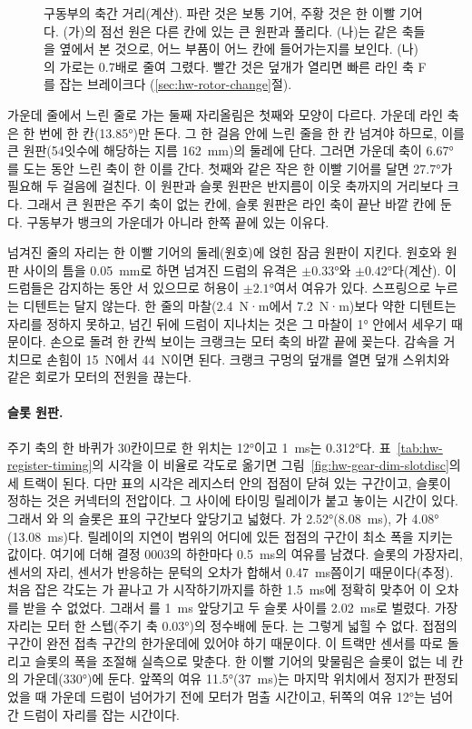 \begin{figure}[ht]
\centering

\caption{구동부의 축간 거리(계산). 파란 것은 보통 기어, 주황 것은 한 이빨 기어다. (가)의 점선 원은 다른 칸에
있는 큰 원판과 풀리다. (나)는 같은 축들을 옆에서 본 것으로, 어느 부품이 어느 칸에 들어가는지를 보인다.
(나)의 가로는 0.7배로 줄여 그렸다. 빨간 것은 덮개가 열리면 빠른 라인 축 F를 잡는 브레이크다
(\ref{sec:hw-rotor-change}절).}
\label{fig:hw-gear-dim-drive}
\end{figure}

가운데 줄에서 느린 줄로 가는 둘째 자리올림은 첫째와 모양이 다르다. 가운데 라인 축은 한 번에 한 칸(13.85°)만
돈다. 그 한 걸음 안에 느린 줄을 한 칸 넘겨야 하므로, 이를 큰 원판(54잇수에 해당하는 지름 162~mm)의 둘레에
단다. 그러면 가운데 축이 6.67°를 도는 동안 느린 축이 한 이를 간다. 첫째와 같은 작은 한 이빨 기어를 달면
27.7°가 필요해 두 걸음에 걸친다. 이 원판과 슬롯 원판은 반지름이 이웃 축까지의 거리보다 크다. 그래서 큰 원판은
주기 축이 없는 칸에, 슬롯 원판은 라인 축이 끝난 바깥 칸에 둔다. 구동부가 뱅크의 가운데가 아니라 한쪽 끝에
있는 이유다.

넘겨진 줄의 자리는 한 이빨 기어의 둘레(원호)에 얹힌 잠금 원판이 지킨다. 원호와 원판 사이의 틈을 0.05~mm로
하면 넘겨진 드럼의 유격은 $\pm 0.33$°와 $\pm 0.42$°다(계산). 이 드럼들은 감지하는 동안 서 있으므로 허용이
$\pm 2.1$°여서 여유가 있다. 스프링으로 누르는 디텐트는 달지 않는다. 한 줄의 마찰(2.4~N·m에서 7.2~N·m)보다
약한 디텐트는 자리를 정하지 못하고, 넘긴 뒤에 드럼이 지나치는 것은 그 마찰이 1° 안에서 세우기 때문이다.
손으로 돌려 한 칸씩 보이는 크랭크는 모터 축의 바깥 끝에 꽂는다. 감속을 거치므로 손힘이 15~N에서 44~N이면
된다. 크랭크 구멍의 덮개를 열면 덮개 스위치와 같은 회로가 모터의 전원을 끊는다.

\paragraph{슬롯 원판.} 주기 축의 한 바퀴가 30칸이므로 한 위치는 12°이고 1~ms는 0.312°다.
표~\ref{tab:hw-register-timing}의 시각을 이 비율로 각도로 옮기면 그림~\ref{fig:hw-gear-dim-slotdisc}의 세 트랙이
된다. 다만 표의 시각은 레지스터 안의 접점이 닫혀 있는 구간이고, 슬롯이 정하는 것은 커넥터의 전압이다. 그 사이에
타이밍 릴레이가 붙고 놓이는 시간이 있다. 그래서 와 의 슬롯은 표의 구간보다 앞당기고
넓혔다. 가 2.52°(8.08~ms), 가 4.08°(13.08~ms)다. 릴레이의 지연이 범위의 어디에 있든 접점의
구간이 최소 폭을 지키는 값이다. 여기에 더해 결정 0003의 하한마다 0.5~ms의 여유를 남겼다. 슬롯의 가장자리, 센서의
자리, 센서가 반응하는 문턱의 오차가 합해서 0.47~ms쯤이기 때문이다(추정). 처음 잡은 각도는 가 끝나고
가 시작하기까지를 하한 1.5~ms에 정확히 맞추어 이 오차를 받을 수 없었다. 그래서 를 1~ms 앞당기고
두 슬롯 사이를 2.02~ms로 벌렸다. 가장자리는 모터 한 스텝(주기 축 0.03°)의 정수배에 둔다. 는 그렇게 넓힐 수 없다. 접점의 구간이 완전 접촉 구간의 한가운데에
있어야 하기 때문이다. 이 트랙만 센서를 따로 돌리고 슬롯의 폭을 조절해 실측으로 맞춘다. 한 이빨 기어의 맞물림은 슬롯이 없는 네 칸의 가운데(330°)에 둔다. 앞쪽의 여유 11.5°(37~ms)는 마지막
위치에서 정지가 판정되었을 때 가운데 드럼이 넘어가기 전에 모터가 멈출 시간이고, 뒤쪽의 여유 12°는 넘어간
드럼이 자리를 잡는 시간이다.

